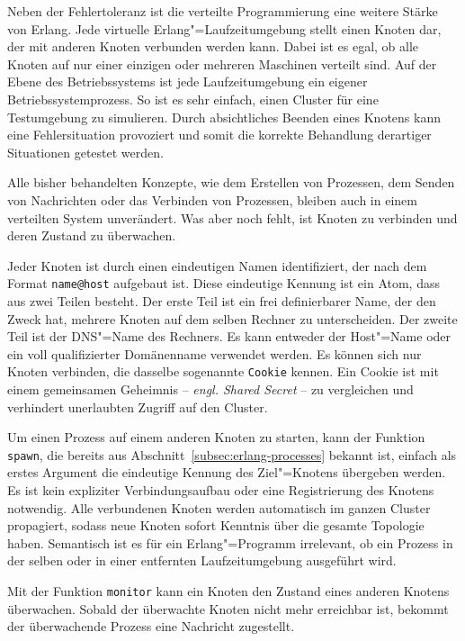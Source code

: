 Neben der Fehlertoleranz ist die verteilte Programmierung eine weitere Stärke von Erlang. Jede virtuelle Erlang"=Laufzeitumgebung stellt einen Knoten dar, der mit anderen Knoten verbunden werden kann. Dabei ist es egal, ob alle Knoten auf nur einer einzigen oder mehreren Maschinen verteilt sind. Auf der Ebene des Betriebssystems ist jede Laufzeitumgebung ein eigener Betriebssystemprozess. So ist es sehr einfach, einen Cluster für eine Testumgebung zu simulieren. Durch absichtliches Beenden eines Knotens kann eine Fehlersituation provoziert und somit die korrekte Behandlung derartiger Situationen getestet werden.

Alle bisher behandelten Konzepte, wie dem Erstellen von Prozessen, dem Senden von Nachrichten oder das Verbinden von Prozessen, bleiben auch in einem verteilten System unverändert. Was aber noch fehlt, ist Knoten zu verbinden und deren Zustand zu überwachen.

Jeder Knoten ist durch einen eindeutigen Namen identifiziert, der nach dem Format \lstinline{name@host} aufgebaut ist. Diese eindeutige Kennung ist ein Atom, dass aus zwei Teilen besteht. Der erste Teil ist ein frei definierbarer Name, der den Zweck hat, mehrere Knoten auf dem selben Rechner zu unterscheiden. Der zweite Teil ist der DNS"=Name des Rechners. Es kann entweder der Host"=Name oder ein voll qualifizierter Domänenname verwendet werden. Es können sich nur Knoten verbinden, die dasselbe sogenannte \lstinline{Cookie} kennen. Ein Cookie ist mit einem gemeinsamen Geheimnis -- \textit{engl. Shared Secret} -- zu vergleichen und verhindert unerlaubten Zugriff auf den Cluster.

Um einen Prozess auf einem anderen Knoten zu starten, kann der Funktion \lstinline{spawn}, die bereits aus Abschnitt~\ref{subsec:erlang-processes} bekannt ist, einfach als erstes Argument die eindeutige Kennung des Ziel"=Knotens übergeben werden. Es ist kein expliziter Verbindungsaufbau oder eine Registrierung des Knotens notwendig. Alle verbundenen Knoten werden automatisch im ganzen Cluster propagiert, sodass neue Knoten sofort Kenntnis über die gesamte Topologie haben. Semantisch ist es für ein Erlang"=Programm irrelevant, ob ein Prozess in der selben oder in einer entfernten Laufzeitumgebung ausgeführt wird.

Mit der Funktion \lstinline{monitor} kann ein Knoten den Zustand eines anderen Knotens überwachen. Sobald der überwachte Knoten nicht mehr erreichbar ist, bekommt der überwachende Prozess eine Nachricht zugestellt.

